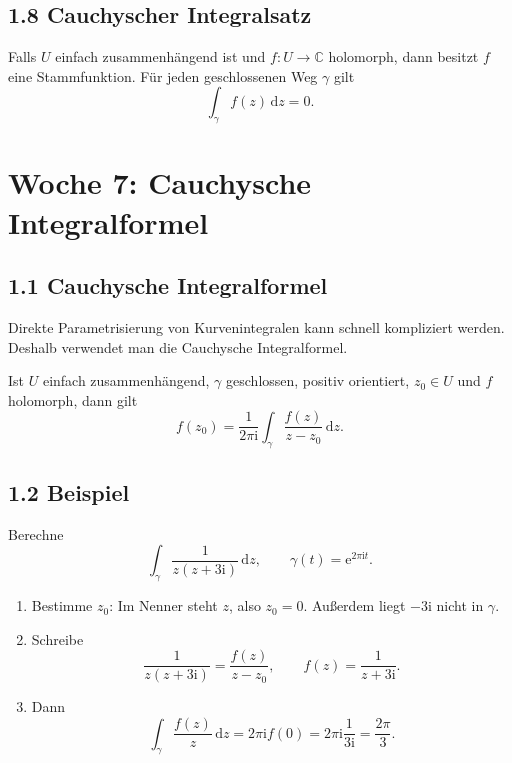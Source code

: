 \documentclass[11pt,a4paper]{article}
\newcommand{\C}{\mathbb C}
\newcommand{\ii}{\mathrm i}
\newcommand{\ee}{\mathrm e}
\newcommand{\dd}{\,\mathrm d}
\begin{document}
\subsection{1.8 Cauchyscher Integralsatz}
\begin{importantbox}
Falls $U$ einfach zusammenhängend ist und $f:U\to\C$ holomorph, dann besitzt $f$ eine Stammfunktion. Für jeden geschlossenen Weg $\gamma$ gilt
\[
\int_\gamma f(z)\dd z=0.
\]
\end{importantbox}

\section{Woche 7: Cauchysche Integralformel}

\subsection{1.1 Cauchysche Integralformel}
Direkte Parametrisierung von Kurvenintegralen kann schnell kompliziert werden. Deshalb verwendet man die Cauchysche Integralformel.

\begin{importantbox}
Ist $U$ einfach zusammenhängend, $\gamma$ geschlossen, positiv orientiert, $z_0\in U$ und $f$ holomorph, dann gilt
\[
f(z_0)=\frac{1}{2\pi\ii}\int_\gamma \frac{f(z)}{z-z_0}\dd z.
\]
\end{importantbox}

\begin{center}
\end{center}

\subsection{1.2 Beispiel}
\begin{beispielbox}
Berechne
\[
\int_\gamma \frac{1}{z(z+3\ii)}\dd z,
\qquad \gamma(t)=\ee^{2\pi\ii t}.
\]
\end{beispielbox}
\begin{kochrezeptbox}
\begin{enumerate}[label=\Roman*.]
\item Bestimme $z_0$: Im Nenner steht $z$, also $z_0=0$. Außerdem liegt $-3\ii$ nicht in $\gamma$.
\item Schreibe
\[
\frac{1}{z(z+3\ii)}=\frac{f(z)}{z-z_0},\qquad f(z)=\frac1{z+3\ii}.
\]
\item Dann
\[
\int_\gamma \frac{f(z)}{z}\dd z=2\pi\ii f(0)=2\pi\ii\frac1{3\ii}=\frac{2\pi}{3}.
\]
\end{enumerate}
\end{kochrezeptbox}
\end{document}
